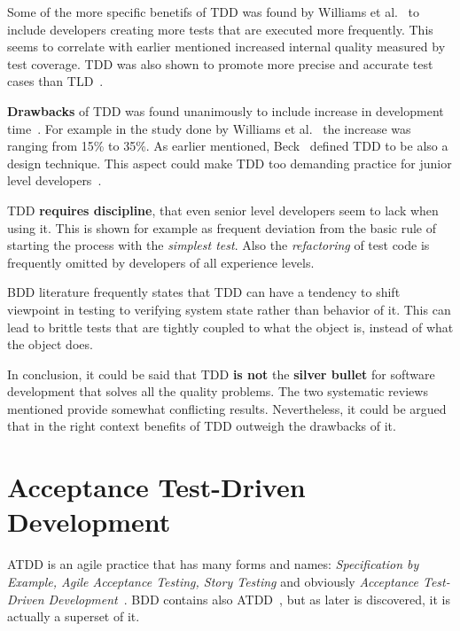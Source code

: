     Some of the more specific benetifs of TDD was found by Williams et al.~\cite{williams2009effectiveness} to include developers
    creating more tests that are executed more frequently. This seems to correlate with earlier mentioned increased internal
    quality measured by test coverage. TDD was also shown to promote more precise and accurate test cases than TLD~\cite{williams2009effectiveness}.

    \textbf{Drawbacks} of TDD was found unanimously to include increase in development time~\cite{kollanus2010test,bissi2016effects,williams2009effectiveness}.
    For example in the study done by Williams et al.~\cite{williams2009effectiveness} the increase was ranging from 15\% to 35\%.
    As earlier mentioned, Beck~\cite{beck2001aim} defined TDD to be also a design technique. This aspect could make TDD too demanding practice for junior
    level developers~\cite{hammond2012test}.

    TDD \textbf{requires discipline}, that even senior level developers seem to lack when using it. This is shown for example as
    frequent deviation from the basic rule of starting the process with the \textit{simplest test}. Also the \textit{refactoring}
    of test code is frequently omitted by developers of all experience levels. ~\cite{aniche2010most}

    BDD literature frequently states that TDD can have a tendency to shift viewpoint in testing to verifying system state
    rather than behavior of it. This can lead to brittle tests that are tightly coupled to what the object is, instead of
    what the object does. ~\cite{chelimsky2010rspec,astels2006new,amodeo2015learning}

    In conclusion, it could be said that TDD \textbf{is not} the \textbf{silver bullet} for software development that solves all the quality problems.
    The two systematic reviews mentioned provide somewhat conflicting results. Nevertheless, it could be argued that in the right
    context benefits of TDD outweigh the drawbacks of it.

\section{Acceptance Test-Driven Development}
    ATDD is an agile practice that has many forms and names: \textit{Specification by Example, Agile Acceptance Testing, Story Testing} and
    obviously \textit{Acceptance Test-Driven Development}~\cite{gartner2012atdd}. BDD contains also
    ATDD~\cite{gartner2012atdd}, but as later is discovered, it is actually a superset of it.

